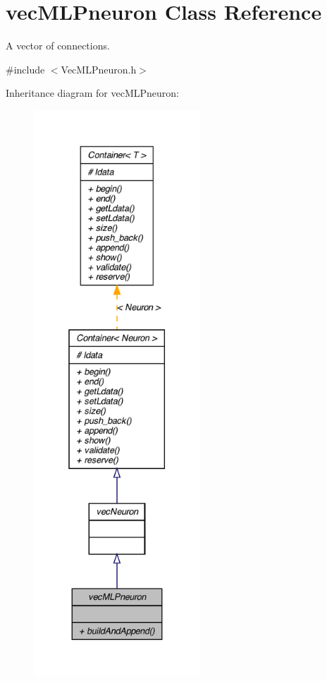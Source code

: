 \hypertarget{classvec_m_l_pneuron}{
\section{vecMLPneuron Class Reference}
\label{classvec_m_l_pneuron}
}


A vector of connections.  




{\ttfamily \#include $<$VecMLPneuron.h$>$}



Inheritance diagram for vecMLPneuron:
\nopagebreak
\begin{figure}[H]
\begin{center}
\leavevmode
\includegraphics[height=600pt]{classvec_m_l_pneuron__inherit__graph}
\end{center}
\end{figure}


